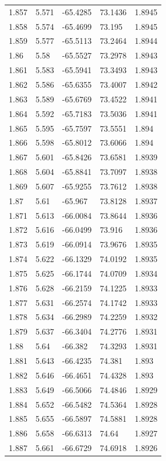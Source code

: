 \begin{tabular}{lllll}
1.857 & 5.571 & -65.4285 & 73.1436 & 1.8945 \\
1.858 & 5.574 & -65.4699 & 73.195 & 1.8945 \\
1.859 & 5.577 & -65.5113 & 73.2464 & 1.8944 \\
1.86 & 5.58 & -65.5527 & 73.2978 & 1.8943 \\
1.861 & 5.583 & -65.5941 & 73.3493 & 1.8943 \\
1.862 & 5.586 & -65.6355 & 73.4007 & 1.8942 \\
1.863 & 5.589 & -65.6769 & 73.4522 & 1.8941 \\
1.864 & 5.592 & -65.7183 & 73.5036 & 1.8941 \\
1.865 & 5.595 & -65.7597 & 73.5551 & 1.894 \\
1.866 & 5.598 & -65.8012 & 73.6066 & 1.894 \\
1.867 & 5.601 & -65.8426 & 73.6581 & 1.8939 \\
1.868 & 5.604 & -65.8841 & 73.7097 & 1.8938 \\
1.869 & 5.607 & -65.9255 & 73.7612 & 1.8938 \\
1.87 & 5.61 & -65.967 & 73.8128 & 1.8937 \\
1.871 & 5.613 & -66.0084 & 73.8644 & 1.8936 \\
1.872 & 5.616 & -66.0499 & 73.916 & 1.8936 \\
1.873 & 5.619 & -66.0914 & 73.9676 & 1.8935 \\
1.874 & 5.622 & -66.1329 & 74.0192 & 1.8935 \\
1.875 & 5.625 & -66.1744 & 74.0709 & 1.8934 \\
1.876 & 5.628 & -66.2159 & 74.1225 & 1.8933 \\
1.877 & 5.631 & -66.2574 & 74.1742 & 1.8933 \\
1.878 & 5.634 & -66.2989 & 74.2259 & 1.8932 \\
1.879 & 5.637 & -66.3404 & 74.2776 & 1.8931 \\
1.88 & 5.64 & -66.382 & 74.3293 & 1.8931 \\
1.881 & 5.643 & -66.4235 & 74.381 & 1.893 \\
1.882 & 5.646 & -66.4651 & 74.4328 & 1.893 \\
1.883 & 5.649 & -66.5066 & 74.4846 & 1.8929 \\
1.884 & 5.652 & -66.5482 & 74.5364 & 1.8928 \\
1.885 & 5.655 & -66.5897 & 74.5881 & 1.8928 \\
1.886 & 5.658 & -66.6313 & 74.64 & 1.8927 \\
1.887 & 5.661 & -66.6729 & 74.6918 & 1.8926 \\

\end{tabular}
